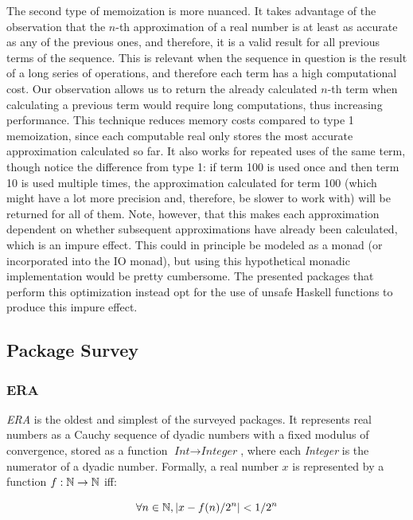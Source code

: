 The second type of memoization is more nuanced. It takes advantage of the observation that the $n$-th approximation of a real number is at least as accurate as any of the previous ones, and therefore, it is a valid result for all previous terms of the sequence. This is relevant when the sequence in question is the result of a long series of operations, and therefore each term has a high computational cost. Our observation allows us to return the already calculated $n$-th term when calculating a previous term would require long computations, thus increasing performance. This technique reduces memory costs compared to type 1 memoization, since each computable real only stores the most accurate approximation calculated so far. It also works for repeated uses of the same term, though notice the difference from type 1: if term 100 is used once and then term 10 is used multiple times, the approximation calculated for term 100 (which might have a lot more precision and, therefore, be slower to work with) will be returned for all of them. Note, however, that this makes each approximation dependent on whether subsequent approximations have already been calculated, which is an impure effect. This could in principle be modeled as a monad (or incorporated into the IO monad), but using this hypothetical monadic implementation would be pretty cumbersome. The presented packages that perform this optimization instead opt for the use of unsafe Haskell functions to produce this impure effect.



\subsection{Package Survey}
\label{sec:survey}

\subsubsection{ERA}
\label{sec:era}

\textit{ERA} \cite{ERA} is the oldest and simplest of the surveyed packages. It represents real numbers as a Cauchy sequence of dyadic numbers with a fixed modulus of convergence, stored as a function $\textit{Int} \rightarrow \textit{Integer}$, where each \textit{Integer} is the numerator of a dyadic number. Formally, a real number $x$ is represented by a function $f: \mathbb{N} \rightarrow \mathbb{N}$ iff:

\begin{equation*}
\forall n \in \mathbb{N}, |x - f(n) / 2^n| < 1 / 2^n
\end{equation*}

